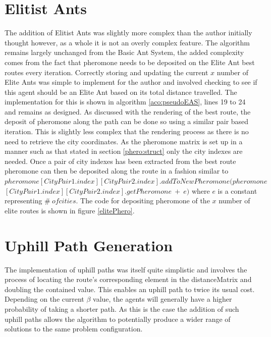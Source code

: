 \section{Elitist Ants}

The addition of Elitist Ants was slightly more complex than the author initially thought however, as a whole it is not an overly complex feature. The algorithm remains largely unchanged from the Basic Ant System, the added complexity comes from the fact that pheromone needs to be deposited on the Elite Ant best routes every iteration. Correctly storing and updating the current $x$ number of Elite Ants was simple to implement for the author and involved checking to see if this agent should be an Elite Ant based on its total distance travelled. The implementation for this is shown in algorithm \ref{aco:pseudoEAS}, lines 19 to 24 and remains as designed. As discussed with the rendering of the best route, the deposit of pheromone along the path can be done so using a similar pair based iteration. This is slightly less complex that the rendering process as there is no need to retrieve the city coordinates. As the pheromone matrix is set up in a manner such as that stated in section \ref{phero:struct} only the city indexes are needed. Once a pair of city indexes has been extracted from the best route pheromone can then be deposited along the route in a fashion similar to $pheromone[CityPair1.index][CityPair2.index].addToNewPheromone(pheromone$ \\ $[CityPair1.index][CityPair2.index].getPheromone\ +\ e )$ where $e$ is a constant representing $\# \ of cities$. The code for depositing pheromone of the $x$ number of elite routes is shown in figure \ref{elitePhero}.

\section{Uphill Path Generation}
\label{uphilbeyond}
The implementation of uphill paths was itself quite simplistic and involves the process of locating the route's corresponding element in the distanceMatrix and doubling the contained value. This enables an uphill path to twice its usual cost. Depending on the current $\beta$ value, the agents will generally have a higher probability of taking a shorter path. As this is the case the addition of such uphill paths allows the algorithm to potentially produce a wider range of solutions to the same problem configuration.


